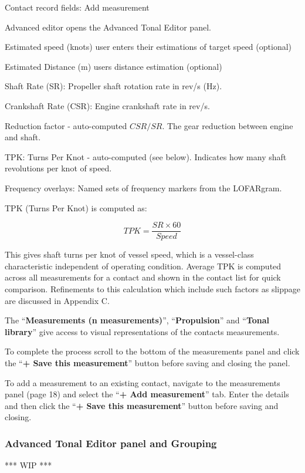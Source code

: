 Contact record fields: Add measurement
\begin{compactitem}
    \item Advanced editor opens the Advanced Tonal Editor panel.
    \item Estimated speed (knots) user enters their estimations of target speed (optional)
    \item Estimated Distance (m) users distance estimation (optional)
    \item Shaft Rate (SR): Propeller shaft rotation rate in rev/s (Hz).
    \item Crankshaft Rate (CSR): Engine crankshaft rate in rev/s.
    \item Reduction factor - auto-computed $CSR / SR$. The gear reduction between engine and shaft.
    \item TPK: Turns Per Knot - auto-computed (see below). Indicates how many shaft revolutions per knot of speed.
    \item Frequency overlays: Named sets of frequency markers from the LOFARgram.
\end{compactitem}

TPK (Turns Per Knot) is computed as:

\[
TPK = \frac{SR \times 60}{Speed}
\]

This gives shaft turns per knot of vessel speed, which is a vessel-class characteristic independent of operating condition. Average TPK is computed across all measurements for a contact and shown in the contact list for quick comparison. Refinements to this calculation which include such factors as slippage are discussed in Appendix C.

The \enquote{\textbf{Measurements (n measurements)}}, \enquote{\textbf{Propulsion}} and \enquote{\textbf{Tonal library}} give access to visual representations of the contacts measurements.

To complete the process scroll to the bottom of the measurements panel and click the \enquote{\textbf{+ Save this measurement}} button before saving and closing the panel.

To add a measurement to an existing contact, navigate to the measurements panel (page 18) and select the \enquote{\textbf{+ Add measurement}} tab. Enter the details and then click the \enquote{\textbf{+ Save this measurement}} button before saving and closing.

\subsubsection{Advanced Tonal Editor panel and Grouping}
\textcolor{commentGreen}{*** WIP ***}


